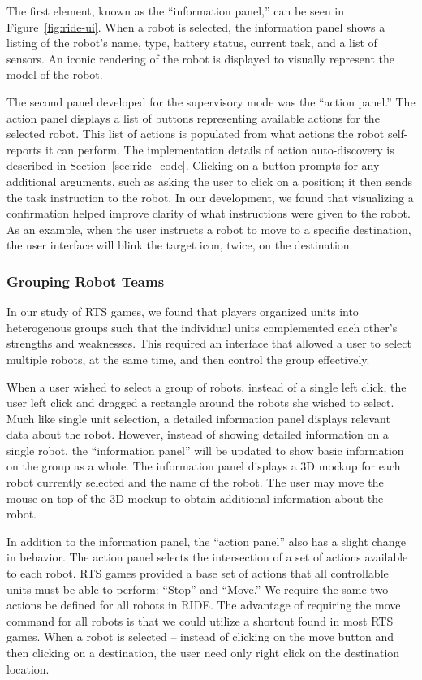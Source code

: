 The first element, known as the ``information panel,'' can be seen in Figure~\ref{fig:ride-ui}. When a robot is selected, the information panel shows a listing of the robot's name, type, battery status, current task, and a list of sensors. An iconic rendering of the robot is displayed to visually represent the model of the robot.

The second panel developed for the supervisory mode was the ``action panel.'' The action panel displays a list of buttons representing available actions for the selected robot. This list of actions is populated from what actions the robot self-reports it can perform. The implementation details of action auto-discovery is described in Section~\ref{sec:ride_code}. Clicking on a button prompts for any additional arguments, such as asking the user to click on a position; it then sends the task instruction to the robot. In our development, we found that visualizing a confirmation helped improve clarity of what instructions were given to the robot. As an example, when the user instructs a robot to move to a specific destination, the user interface will blink the target icon, twice, on the destination.  

\subsubsection{Grouping Robot Teams} %
\label{ssub:grouping_robot_teams}
In our study of RTS games, we found that players organized units into heterogenous groups such that the individual units complemented each other's strengths and weaknesses. This required an interface that allowed a user to select multiple robots, at the same time, and then control the group effectively.

When a user wished to select a group of robots, instead of a single left click, the user left click and dragged a rectangle around the robots she wished to select. Much like single unit selection, a detailed information panel displays relevant data about the robot. However, instead of showing detailed information on a single robot, the ``information panel'' will be updated to show basic information on the group as a whole. The information panel displays a 3D mockup for each robot currently selected and the name of the robot. The user may move the mouse on top of the 3D mockup to obtain additional information about the robot.

In addition to the information panel, the ``action panel'' also has a slight change in behavior. The action panel selects the intersection of a set of actions available to each robot. RTS games provided a base set of actions that all controllable units must be able to perform: ``Stop'' and ``Move.'' We require the same two actions be defined for all robots in RIDE. The advantage of requiring the move command for all robots is that we could utilize a shortcut found in most RTS games. When a robot is selected -- instead of clicking on the move button and then clicking on a destination, the user need only right click on the destination location.

